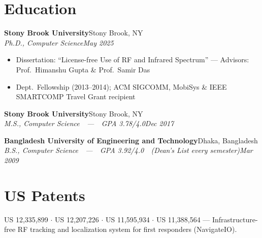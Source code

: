\documentclass[10.5pt,letterpaper]{article}
\newcommand{\entrytitle}[2]{%
  \textbf{#1}\hfill #2%
}
\newcommand{\entrysub}[2]{%
  \vspace{1pt}\textit{#1}\hfill \textit{#2}%
}
\begin{document}
\section{Education}

\entrytitle{Stony Brook University}{Stony Brook, NY}\\
\entrysub{Ph.D., Computer Science}{May 2025}
\begin{itemize}
  \item Dissertation: ``License-free Use of RF and Infrared Spectrum'' ---
        Advisors: Prof.\ Himanshu Gupta \& Prof.\ Samir Das
  \item Dept.\ Fellowship (2013--2014); ACM SIGCOMM, MobiSys \& IEEE SMARTCOMP Travel Grant recipient
\end{itemize}

\vspace{2pt}
\entrytitle{Stony Brook University}{Stony Brook, NY}\\
\entrysub{M.S., Computer Science\ \ ---\ \ GPA 3.78/4.0}{Dec 2017}

\vspace{2pt}
\entrytitle{Bangladesh University of Engineering and Technology}{Dhaka, Bangladesh}\\
\entrysub{B.S., Computer Science\ \ ---\ \ GPA 3.92/4.0\ \ (Dean's List every semester)}{Mar 2009}
%
\section{US Patents}
US 12,335,899 $\cdot$ US 12,207,226 $\cdot$ US 11,595,934 $\cdot$ US 11,388,564 --- Infrastructure-free RF tracking and localization system for first responders (NavigateIO).
%
\end{document}
